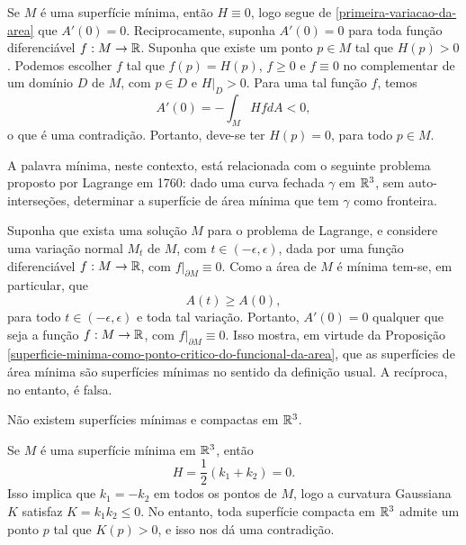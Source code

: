 \begin{demonstracao}
	Se $M$ é uma superfície mínima, então $H \equiv 0$, logo segue de \eqref{primeira-variacao-da-area} que $A'(0)=0$. Reciprocamente, suponha $A'(0)=0$ para toda função diferenciável $f: M \rightarrow \mathbb{R}$. Suponha que existe um ponto $p \in M$ tal que $H(p)>0$. Podemos escolher $f$ tal que $f(p) = H(p)$, $f \geq 0$ e $f \equiv 0$ no complementar de um domínio $D$ de $M$, com $p \in D$ e $H \vert_D >0$. Para uma tal função $f$, temos
	\begin{equation*}
		A'(0) = -\int_M H f dA <0,
	\end{equation*}
	o que é uma contradição. Portanto, deve-se ter $H(p)=0$, para todo $p \in M$.
\end{demonstracao}

A palavra mínima, neste contexto, está relacionada com o seguinte problema proposto por Lagrange em 1760: dado uma curva fechada $\gamma$ em $\mathbb{R}^3$, sem auto-interseções, determinar a superfície de área mínima que tem $\gamma$ como fronteira.

Suponha que exista uma solução $M$ para o problema de Lagrange, e considere uma variação normal $M_t$ de $M$, com $t \in (-\epsilon,\epsilon)$, dada por uma função diferenciável $f: M \rightarrow \mathbb{R}$, com $f \vert_{\partial M} \equiv 0$. Como a área de $M$ é mínima tem-se, em particular, que
\begin{equation*}
	A(t) \geq A(0),
\end{equation*}
para todo $t \in (-\epsilon,\epsilon)$ e toda tal variação. Portanto, $A'(0)=0$ qualquer que seja a função $f: M \rightarrow \mathbb{R}$, com $f \vert_{\partial M} \equiv 0$. Isso mostra, em virtude da Proposição \ref{superficie-minima-como-ponto-critico-do-funcional-da-area}, que as superfícies de área mínima são superfícies mínimas no sentido da definição usual. A recíproca, no entanto, é falsa.

\begin{proposicao}
	Não existem superfícies mínimas e compactas em $\mathbb{R}^3$.
\end{proposicao}

\begin{demonstracao}
	Se $M$ é uma superfície mínima em $\mathbb{R}^3$, então
	\begin{equation*}
		H = \frac{1}{2} (k_1 + k_2) = 0.
	\end{equation*}
	Isso implica que $k_1=-k_2$ em todos os pontos de $M$, logo a curvatura Gaussiana $K$ satisfaz $K = k_1 k_2 \leq 0$. No entanto, toda superfície compacta em $\mathbb{R}^3$ admite um ponto $p$ tal que $K(p)>0$, e isso nos dá uma contradição.
\end{demonstracao}

